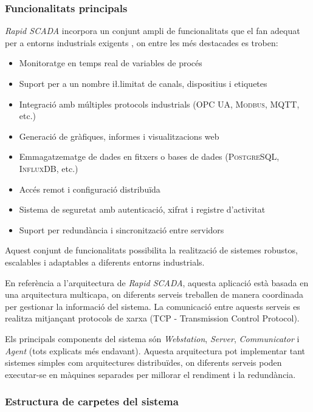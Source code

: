 \documentclass[a4paper,11pt,DIV=13,headings=normal,abstract=true,twoside=semi]{article}
\newcommand{\acro}[1]{\textsc{#1}}
\begin{document}
\subsubsection{Funcionalitats principals}

\emph{Rapid SCADA} incorpora un conjunt ampli de funcionalitats que el fan adequat per a entorns industrials exigents \cite{rapidscada_intro}, on entre les més destacades es troben:

\begin{itemize}
    \item Monitoratge en temps real de variables de procés
    \item Suport per a un nombre i\l.limitat de canals, dispositius i etiquetes
    \item Integració amb múltiples protocols industrials (\acro{OPC UA}, \acro{Modbus}, \acro{MQTT}, etc.)
    \item Generació de gràfiques, informes i visualitzacions web
    \item Emmagatzematge de dades en fitxers o bases de dades (\acro{PostgreSQL}, \acro{InfluxDB}, etc.)
    \item Accés remot i configuració distribuïda
    \item Sistema de seguretat amb autenticació, xifrat i registre d'activitat
    \item Suport per redundància i sincronització entre servidors
\end{itemize}

Aquest conjunt de funcionalitats possibilita la realització de sistemes robustos, escalables i adaptables a diferents entorns industrials.

En referència a l'arquitectura de \emph{Rapid SCADA}, aquesta aplicació està basada en una arquitectura multicapa, on diferents serveis treballen de manera coordinada per gestionar la informació del sistema. La comunicació entre aquests serveis es realitza mitjançant protocols de xarxa (\acro{TCP} -  Transmission Control Protocol).

Els principals components del sistema són \emph{Webstation}, \emph{Server}, \emph{Communicator} i \emph{Agent} (tots explicats més endavant). Aquesta arquitectura pot implementar tant sistemes simples com arquitectures distribuïdes, on diferents serveis poden executar-se en màquines separades per millorar el rendiment i la redundància.

\subsubsection{Estructura de carpetes del sistema}
\end{document}
